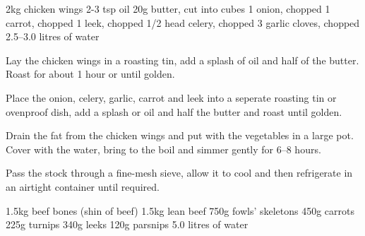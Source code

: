 \label{rec:chicken-stock}
\begin{ingreds}
	2kg chicken wings
    2-3 tsp oil
    20g butter, cut into cubes
    1 onion, chopped
    1 carrot, chopped
	1 leek, chopped
	1/2 head celery, chopped
	3 garlic cloves, chopped
	2.5--3.0 litres of water

\end{ingreds}

\begin{method}
    Lay the chicken wings in a roasting tin, add a splash of oil and half of the butter.  Roast for about 1 hour or until golden.

    Place the onion, celery, garlic, carrot and leek into a seperate roasting tin or ovenproof dish, add a splash or oil and half the butter and roast until golden.

   	Drain the fat from the chicken wings and put with the vegetables in a large pot.  Cover with the water, bring to the boil and simmer gently for 6--8 hours.

	Pass the stock through a fine-mesh sieve, allow it to cool and then refrigerate in an airtight container until required.
\end {method}

\label{rec:escoffier-fonds-blanc}
\begin{ingreds}
	1.5kg beef bones (shin of beef)
	1.5kg lean beef
	750g fowls' skeletons
	450g carrots
	225g turnips
	340g leeks
	120g parsnips
	5.0 litres of water
\end{ingreds}


